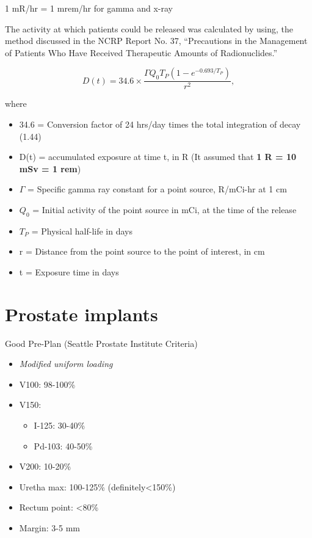 \documentclass[]{book}
\providecommand{\tightlist}{%
  \setlength{\itemsep}{0pt}\setlength{\parskip}{0pt}}
\theoremstyle{definition}
\theoremstyle{definition}
\theoremstyle{definition}
\theoremstyle{remark}
\begin{document}
1 mR/hr = 1 mrem/hr for gamma and x-ray

The activity at which patients could be released was calculated by
using, the method discussed in the NCRP Report No. 37, ``Precautions in
the Management of Patients Who Have Received Therapeutic Amounts of
Radionuclides.''

\begin{equation}
  D(t)=34.6\times \frac {\Gamma Q_0 T_P \left(1-e^{-0.693/T_P}\right)}   {r^2},
\end{equation}

where

\begin{itemize}
\tightlist
\item
  34.6 = Conversion factor of 24 hrs/day times the total integration of
  decay (1.44)
\item
  D(t) = accumulated exposure at time t, in R (It assumed that \textbf{1
  R = 10 mSv = 1 rem})
\item
  \(\Gamma\) = Specific gamma ray constant for a point source, R/mCi-hr
  at 1 cm
\item
  \(Q_0\) = Initial activity of the point source in mCi, at the time of
  the release
\item
  \(T_P\) = Physical half-life in days
\item
  r = Distance from the point source to the point of interest, in cm
\item
  t = Exposure time in days
\end{itemize}

\section{Prostate implants}\label{prostate-implants}

Good Pre-Plan (Seattle Prostate Institute Criteria)

\begin{itemize}
\tightlist
\item
  \emph{Modified uniform loading}
\item
  V100: 98-100\%
\item
  V150:

  \begin{itemize}
  \tightlist
  \item
    I-125: 30-40\%
  \item
    Pd-103: 40-50\%
  \end{itemize}
\item
  V200: 10-20\%
\item
  Uretha max: 100-125\% (definitely\textless{}150\%)
\item
  Rectum point: \textless{}80\%
\item
  Margin: 3-5 mm
\end{itemize}
\end{document}
